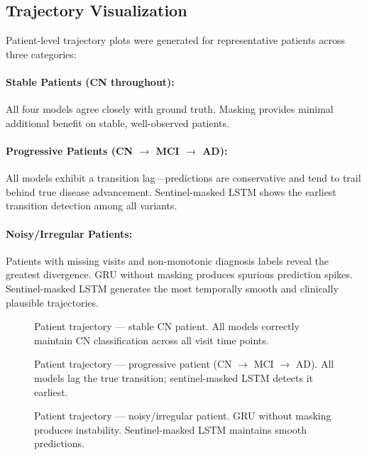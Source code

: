\documentclass[12pt,singleside,a4paper]{article}
\begin{document}
\subsection{Trajectory Visualization}

Patient-level trajectory plots were generated for representative patients across three categories:

\paragraph{Stable Patients (CN throughout):} All four models agree closely with ground truth. Masking provides minimal additional benefit on stable, well-observed patients.

\paragraph{Progressive Patients (CN $\to$ MCI $\to$ AD):} All models exhibit a transition lag—predictions are conservative and tend to trail behind true disease advancement. Sentinel-masked LSTM shows the earliest transition detection among all variants.

\paragraph{Noisy/Irregular Patients:} Patients with missing visits and non-monotonic diagnosis labels reveal the greatest divergence. GRU without masking produces spurious prediction spikes. Sentinel-masked LSTM generates the most temporally smooth and clinically plausible trajectories.

\begin{figure}[h]
\centering
\caption{Patient trajectory --- stable CN patient. All models correctly maintain CN classification across all visit time points.}
\end{figure}

\begin{figure}[h]
\centering
\caption{Patient trajectory --- progressive patient (CN $\to$ MCI $\to$ AD). All models lag the true transition; sentinel-masked LSTM detects it earliest.}
\end{figure}

\begin{figure}[h]
\centering
\caption{Patient trajectory --- noisy/irregular patient. GRU without masking produces instability. Sentinel-masked LSTM maintains smooth predictions.}
\end{figure}
\end{document}
